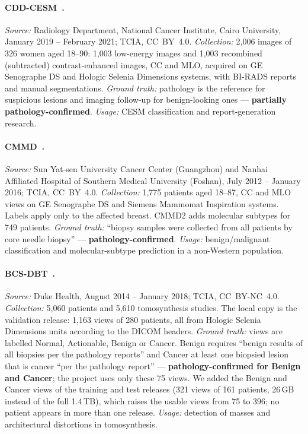 \documentclass[11pt]{article}
\begin{document}
\paragraph{CDD-CESM~\citep{khaled2022cddcesm}.}
\emph{Source:} Radiology Department, National Cancer Institute, Cairo
University, January 2019 -- February 2021; TCIA, CC~BY~4.0.
\emph{Collection:} 2,006 images of 326 women aged 18--90: 1,003 low-energy
images and 1,003 recombined (subtracted) contrast-enhanced images, CC and MLO,
acquired on GE Senographe DS and Hologic Selenia Dimensions systems, with
BI-RADS reports and manual segmentations. \emph{Ground truth:} pathology is
the reference for suspicious lesions and imaging follow-up for benign-looking
ones --- \textbf{partially pathology-confirmed}. \emph{Usage:} CESM
classification and report-generation research.

\paragraph{CMMD~\citep{cai2023cmmd,cui2021cmmd}.}
\emph{Source:} Sun Yat-sen University Cancer Center (Guangzhou) and Nanhai
Affiliated Hospital of Southern Medical University (Foshan), July 2012 --
January 2016; TCIA, CC~BY~4.0. \emph{Collection:} 1,775 patients aged 18--87,
CC and MLO views on GE Senographe DS and Siemens Mammomat Inspiration systems.
Labels apply only to the affected breast. CMMD2 adds molecular subtypes for
749 patients. \emph{Ground truth:} ``biopsy samples were collected from all
patients by core needle biopsy'' --- \textbf{pathology-confirmed}.
\emph{Usage:} benign/malignant classification and molecular-subtype prediction
in a non-Western population.

\paragraph{BCS-DBT~\citep{buda2021bcsdbt}.}
\emph{Source:} Duke Health, August 2014 -- January 2018; TCIA, CC~BY-NC~4.0.
\emph{Collection:} 5,060 patients and 5,610 tomosynthesis studies. The local
copy is the validation release: 1,163 views of 280 patients, all from Hologic
Selenia Dimensions units according to the DICOM headers. \emph{Ground truth:}
views are labelled Normal, Actionable, Benign or Cancer. Benign requires
``benign results of all biopsies per the pathology reports'' and Cancer at
least one biopsied lesion that is cancer ``per the pathology report'' ---
\textbf{pathology-confirmed for Benign and Cancer}; the project uses only
these 75 views. We added the Benign and Cancer views of the training and test
releases (321 views of 161 patients, 26\,GB instead of the full 1.4\,TB), which
raises the usable views from 75 to 396; no patient appears in more than one
release. \emph{Usage:} detection of masses and architectural distortions in
tomosynthesis.
\end{document}

